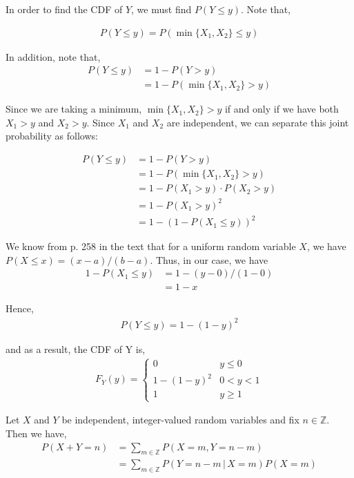 \documentclass[12pt]{article}
\newenvironment{problem}[2][Problem]{\begin{trivlist}
\item[\hskip \labelsep {\bfseries #1}\hskip \labelsep {\bfseries #2.}]}{\end{trivlist}}
\begin{document}
In order to find the CDF of $Y$, we must find $P(Y \leq y)$. Note that,

\begin{align*}
P(Y \leq y) = P(\min \{X_1, X_2\} \leq y)
\end{align*}

In addition, note that,
\begin{align*}
P(Y \leq y) &= 1 - P(Y > y)\\
&= 1 - P(\min \{X_1, X_2\} > y)
\end{align*}

Since we are taking a minimum, $\min \{X_1, X_2\} > y$ if and only if we have both $X_1 > y$ and $X_2 > y$. Since $X_1$ and $X_2$ are independent, we can separate this joint probability as follows:

\begin{align*}
P(Y \leq y) &= 1 - P(Y > y)\\
&= 1 - P(\min \{X_1, X_2\} > y)\\
&= 1 - P(X_1 > y) \cdot P(X_2 > y)\\
&= 1 - P(X_1 > y)^2\\
&= 1 - (1 - P(X_1 \leq y))^2
\end{align*}

We know from p. 258 in the text that for a uniform random variable $X$, we have $P(X \leq x) = (x - a)/(b - a)$. Thus, in our case, we have
\begin{align*}
1 - P(X_1 \leq y) &= 1 - (y - 0)/(1 - 0)\\
&= 1 - x
\end{align*}

Hence,
\begin{align*}
P(Y \leq y) = 1 - (1 - y)^2
\end{align*}

and as a result, the CDF of Y is,
\begin{align*}
F_Y(y) = \begin{cases} 
      0 & y \leq 0 \\
      1 - (1 - y)^2 & 0 < y < 1 \\
      1 & y \geq 1
   \end{cases}
\end{align*}

\newpage

\begin{problem}{3}
\end{problem}

Let $X$ and $Y$ be independent, integer-valued random variables and fix $n \in \mathbb{Z}$. Then we have,
\begin{align*}
P(X + Y = n) &= \sum_{m \in \mathbb{Z}} P(X = m, Y = n - m)\\
&= \sum_{m \in \mathbb{Z}} P(Y = n - m  \, | \, X = m) P(X = m)
\end{align*}
\end{document}
